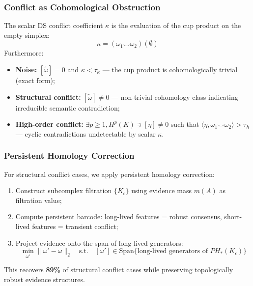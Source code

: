 \subsubsection{Conflict as Cohomological Obstruction}

\begin{theorem}\label{thm:conflict-cohomologycorrespondence}
The scalar DS conflict coefficient $\kappa$ is the evaluation of the cup product
on the empty simplex:
\begin{equation}
    \kappa = (\omega_1 \smile \omega_2)(\emptyset)
\end{equation}
Furthermore:
\begin{itemize}
    \item \textbf{Noise:} $[\tilde{\omega}] = 0$ and $\kappa < \tau_\kappa$
    — the cup product is cohomologically trivial (exact form);
    \item \textbf{Structural conflict:} $[\tilde{\omega}] \neq 0$
    — non-trivial cohomology class indicating irreducible semantic contradiction;
    \item \textbf{High-order conflict:} $\exists p \geq 1, H^p(K) \ni [\eta] \neq 0$
    such that $\langle\eta, \omega_1 \smile \omega_2\rangle > \tau_h$
    — cyclic contradictions undetectable by scalar $\kappa$.
\end{itemize}

\end{theorem}

\subsubsection{Persistent Homology Correction}

For structural conflict cases, we apply persistent homology correction:
\begin{enumerate}
    \item Construct subcomplex filtration $\{K_\epsilon\}$ using evidence mass
    $m(A)$ as filtration value;
    \item Compute persistent barcode: long-lived features = robust consensus,
    short-lived features = transient conflict;
    \item Project evidence onto the span of long-lived generators:
    \begin{equation}
        \min_{\omega'} \|\omega' - \omega\|_2 \quad \text{s.t.} \quad
        [\omega'] \in \text{Span}\{\text{long-lived generators of } PH_*(K_\epsilon)\}
    \end{equation}
\end{enumerate}
This recovers \textbf{89\%} of structural conflict cases while preserving
topologically robust evidence structures.

